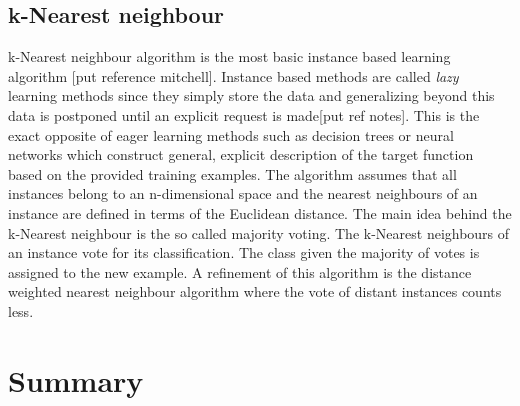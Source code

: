 \subsection{k-Nearest neighbour}
k-Nearest neighbour algorithm is the most basic instance based learning algorithm [put reference mitchell]. Instance based methods are called \emph{lazy} learning methods since they simply store the data and generalizing beyond this data is postponed until an explicit request is made[put ref notes]. This is the exact opposite of eager learning methods such as decision trees or neural networks which construct general, explicit description of the target function based on the provided training examples. The algorithm assumes that all instances belong to an n-dimensional space and the nearest neighbours of an instance are defined in terms of the Euclidean distance. The main idea behind the k-Nearest neighbour is the so called majority voting. The k-Nearest neighbours of an instance vote for its classification. The class given the majority of votes is assigned to the new example. A refinement of this algorithm is the distance weighted nearest neighbour algorithm where the vote of distant instances counts less.  

\section{Summary}



